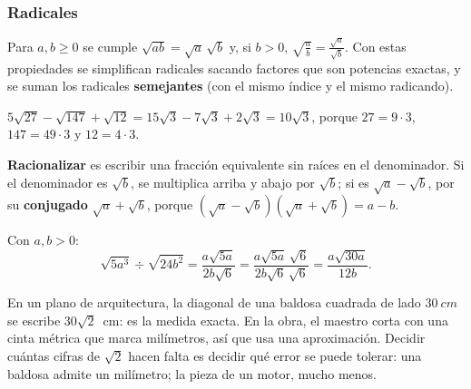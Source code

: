 \documentclass[11pt]{article}
\begin{document}
\subsubsection*{Radicales}

Para $a, b \ge 0$ se cumple $\sqrt{ab} = \sqrt{a}\,\sqrt{b}$ y, si $b > 0$,
$\sqrt{\frac{a}{b}} = \frac{\sqrt{a}}{\sqrt{b}}$. Con estas propiedades se
simplifican radicales sacando factores que son potencias exactas, y se suman
los radicales \textbf{semejantes} (con el mismo índice y el mismo radicando).

\begin{ejemplo}
$5\sqrt{27} - \sqrt{147} + \sqrt{12} = 15\sqrt{3} - 7\sqrt{3} + 2\sqrt{3} =
10\sqrt{3}$, porque $27 = 9 \cdot 3$, $147 = 49 \cdot 3$ y $12 = 4 \cdot 3$.
\end{ejemplo}

\textbf{Racionalizar} es escribir una fracción equivalente sin raíces en el
denominador. Si el denominador es $\sqrt{b}$, se multiplica arriba y abajo
por $\sqrt{b}$; si es $\sqrt{a} - \sqrt{b}$, por su \textbf{conjugado}
$\sqrt{a} + \sqrt{b}$, porque
$(\sqrt{a} - \sqrt{b})(\sqrt{a} + \sqrt{b}) = a - b$.

\begin{ejemplo}
Con $a, b > 0$:
\[
  \sqrt{5a^3} \div \sqrt{24b^2} = \frac{a\sqrt{5a}}{2b\sqrt{6}}
  = \frac{a\sqrt{5a}\,\sqrt{6}}{2b\sqrt{6}\,\sqrt{6}} = \frac{a\sqrt{30a}}{12b}.
\]
\end{ejemplo}

\begin{aplicacion}
En un plano de arquitectura, la diagonal de una baldosa cuadrada de lado
$\qty{30}{cm}$ se escribe $30\sqrt{2}$~cm: es la medida exacta. En la obra,
el maestro corta con una cinta métrica que marca milímetros, así que usa una
aproximación. Decidir cuántas cifras de $\sqrt{2}$ hacen falta es decidir qué
error se puede tolerar: una baldosa admite un milímetro; la pieza de un motor,
mucho menos.
\end{aplicacion}
\end{document}
